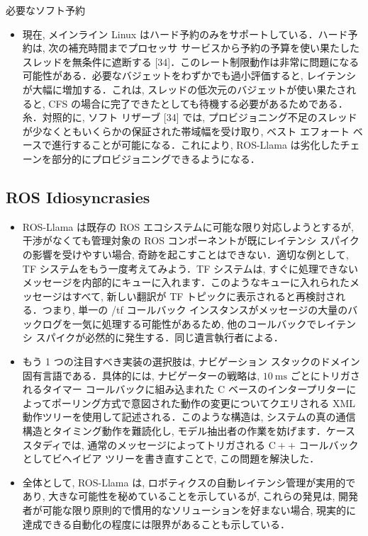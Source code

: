 \begin{frame}{必要なソフト予約}
    \begin{itemize}
        \item 現在, メインライン Linux はハード予約のみをサポートしている．ハード予約は, 次の補充時間までプロセッサ サービスから予約の予算を使い果たしたスレッドを無条件に遮断する [34]．このレート制限動作は非常に問題になる可能性がある．必要なバジェットをわずかでも過小評価すると, レイテンシが大幅に増加する．これは, スレッドの低次元のバジェットが使い果たされると, CFS の場合に完了できたとしても待機する必要があるためである．糸．対照的に, ソフト リザーブ [34] では, プロビジョニング不足のスレッドが少なくともいくらかの保証された帯域幅を受け取り, ベスト エフォート ベースで進行することが可能になる．これにより, ROS-Llama は劣化したチェーンを部分的にプロビジョニングできるようになる．
    \end{itemize}
\end{frame}


\subsection{ROS Idiosyncrasies}
\label{ssec: ros idiosyncrasies}

\begin{frame}{}
    \begin{itemize}
        \item ROS-Llama は既存の ROS エコシステムに可能な限り対応しようとするが, 干渉がなくても管理対象の ROS コンポーネントが既にレイテンシ スパイクの影響を受けやすい場合, 奇跡を起こすことはできない．適切な例として, TF システムをもう一度考えてみよう．TF システムは, すぐに処理できないメッセージを内部的にキューに入れます．このようなキューに入れられたメッセージはすべて, 新しい翻訳が TF トピックに表示されると再検討される．つまり, 単一の /tf コールバック インスタンスがメッセージの大量のバックログを一気に処理する可能性があるため, 他のコールバックでレイテンシ スパイクが必然的に発生する．同じ遺言執行者による．
    \end{itemize}
\end{frame}

\begin{frame}{}
    \begin{itemize}
        \item もう 1 つの注目すべき実装の選択肢は, ナビゲーション スタックのドメイン固有言語である．具体的には, ナビゲーターの戦略は, $10 \mathrm{~ms}$ ごとにトリガされるタイマー コールバックに組み込まれた C ベースのインタープリターによってポーリング方式で意図された動作の変更についてクエリされる XML 動作ツリーを使用して記述される．このような構造は, システムの真の通信構造とタイミング動作を難読化し, モデル抽出者の作業を妨げます．ケース スタディでは, 通常のメッセージによってトリガされる $\mathrm{C}++$ コールバックとしてビヘイビア ツリーを書き直すことで, この問題を解決した．
    \end{itemize}
\end{frame}

\begin{frame}{}
    \begin{itemize}
        \item 全体として, ROS-Llama は, ロボティクスの自動レイテンシ管理が実用的であり, 大きな可能性を秘めていることを示しているが, これらの発見は, 開発者が可能な限り原則的で慣用的なソリューションを好まない場合, 現実的に達成できる自動化の程度には限界があることも示している．
    \end{itemize}
\end{frame}
